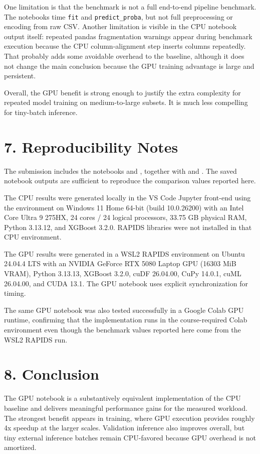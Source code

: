 \documentclass[10pt]{article}
\begin{document}
One limitation is that the benchmark is not a full end-to-end pipeline benchmark. The notebooks time \texttt{fit} and \texttt{predict\_proba}, but not full preprocessing or encoding from raw CSV. Another limitation is visible in the CPU notebook output itself: repeated pandas fragmentation warnings appear during benchmark execution because the CPU column-alignment step inserts columns repeatedly. That probably adds some avoidable overhead to the baseline, although it does not change the main conclusion because the GPU training advantage is large and persistent.

Overall, the GPU benefit is strong enough to justify the extra complexity for repeated model training on medium-to-large subsets. It is much less compelling for tiny-batch inference.

\section*{7. Reproducibility Notes}
The submission includes the notebooks  and , together with  and . The saved notebook outputs are sufficient to reproduce the comparison values reported here.

The CPU results were generated locally in the VS Code Jupyter front-end using the  environment on Windows 11 Home 64-bit (build 10.0.26200) with an Intel Core Ultra 9 275HX, 24 cores / 24 logical processors, 33.75 GB physical RAM, Python 3.13.12, and XGBoost 3.2.0. RAPIDS libraries were not installed in that CPU environment.

The GPU results were generated in a WSL2 RAPIDS environment on Ubuntu 24.04.4 LTS with an NVIDIA GeForce RTX 5080 Laptop GPU (16303 MiB VRAM), Python 3.13.13, XGBoost 3.2.0, cuDF 26.04.00, CuPy 14.0.1, cuML 26.04.00, and CUDA 13.1. The GPU notebook uses explicit synchronization for timing.

The same GPU notebook was also tested successfully in a Google Colab GPU runtime, confirming that the implementation runs in the course-required Colab environment even though the benchmark values reported here come from the WSL2 RAPIDS run.

\section*{8. Conclusion}
The GPU notebook is a substantively equivalent implementation of the CPU baseline and delivers meaningful performance gains for the measured workload. The strongest benefit appears in training, where GPU execution provides roughly 4x speedup at the larger scales. Validation inference also improves overall, but tiny external inference batches remain CPU-favored because GPU overhead is not amortized.
\end{document}
